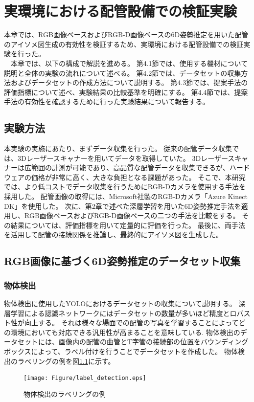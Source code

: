 ﻿\chapter{実環境における配管設備での検証実験}
本章では、RGB画像ベースおよびRGB-D画像ベースの6D姿勢推定を用いた配管のアイソメ図生成の有効性を検証するため、実環境における配管設備での検証実験を行った。\\
　本章では、以下の構成で解説を進める。
第4.1節では、使用する機材について説明と全体の実験の流れについて述べる。
第4.2節では、データセットの収集方法およびデータセットの作成方法について説明する。
第4.3節では、提案手法の評価指標について述べ、実験結果の比較基準を明確にする。
第4.4節では、提案手法の有効性を確認するために行った実験結果について報告する。

\section{実験方法}
本実験の実施にあたり、まずデータ収集を行った。
従来の配管データ収集では、3Dレーザースキャナーを用いてデータを取得していた。
3Dレーザースキャナーは広範囲の計測が可能であり、高品質な配管データを収集できるが、ハードウェアの価格が非常に高く、大きな負担となる課題があった。
そこで、本研究では、より低コストでデータ収集を行うためにRGB-Dカメラを使用する手法を採用した。
配管画像の取得には、Microsoft社製のRGB-Dカメラ「Azure Kinect DK」を使用した。
次に、第2章で述べた深層学習を用いた6D姿勢推定手法を適用し、RGB画像ベースおよびRGB-D画像ベースの二つの手法を比較をする。
その結果については、評価指標を用いて定量的に評価を行った。
最後に、両手法を活用して配管の接続関係を推論し、最終的にアイソメ図を生成した。

\section{RGB画像に基づく6D姿勢推定のデータセット収集}

\subsection{物体検出}
物体検出に使用したYOLOにおけるデータセットの収集について説明する。
深層学習による認識ネットワークにはデータセットの数量が多いほど精度とロバスト性が向上する。
それは様々な場面での配管の写真を学習することによってどの環境においても対応できる汎用性が高まることを意味している.
物体検出のデータセットには、画像内の配管の曲管とT字管の接続部の位置をバウンディングボックスによって、ラベル付けを行うことでデータセットを作成した。
物体検出のラベリングの例を図\ref{fig:4-f1}に示す。
\begin{figure}[htbt]
	\centering
	 \texttt{[image: Figure/label\_detection.eps]}
	 \caption{物体検出のラベリングの例}
	 \label{fig:4-f1}
\end{figure}

